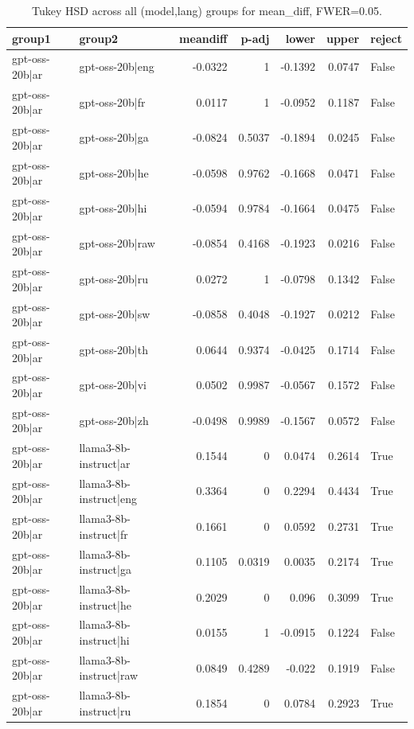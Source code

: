 \begin{table}
\caption{Tukey HSD across all (model,lang) groups for mean_diff, FWER=0.05.}
\label{tab:tukey_all_models_all_langs_mean_diff}
\begin{tabular}{l l r r r r l}
\toprule
group1 & group2 & meandiff & p-adj & lower & upper & reject \\
\midrule
gpt-oss-20b|ar & gpt-oss-20b|eng & -0.0322 & 1 & -0.1392 & 0.0747 & False \\
gpt-oss-20b|ar & gpt-oss-20b|fr & 0.0117 & 1 & -0.0952 & 0.1187 & False \\
gpt-oss-20b|ar & gpt-oss-20b|ga & -0.0824 & 0.5037 & -0.1894 & 0.0245 & False \\
gpt-oss-20b|ar & gpt-oss-20b|he & -0.0598 & 0.9762 & -0.1668 & 0.0471 & False \\
gpt-oss-20b|ar & gpt-oss-20b|hi & -0.0594 & 0.9784 & -0.1664 & 0.0475 & False \\
gpt-oss-20b|ar & gpt-oss-20b|raw & -0.0854 & 0.4168 & -0.1923 & 0.0216 & False \\
gpt-oss-20b|ar & gpt-oss-20b|ru & 0.0272 & 1 & -0.0798 & 0.1342 & False \\
gpt-oss-20b|ar & gpt-oss-20b|sw & -0.0858 & 0.4048 & -0.1927 & 0.0212 & False \\
gpt-oss-20b|ar & gpt-oss-20b|th & 0.0644 & 0.9374 & -0.0425 & 0.1714 & False \\
gpt-oss-20b|ar & gpt-oss-20b|vi & 0.0502 & 0.9987 & -0.0567 & 0.1572 & False \\
gpt-oss-20b|ar & gpt-oss-20b|zh & -0.0498 & 0.9989 & -0.1567 & 0.0572 & False \\
gpt-oss-20b|ar & llama3-8b-instruct|ar & 0.1544 & 0 & 0.0474 & 0.2614 & True \\
gpt-oss-20b|ar & llama3-8b-instruct|eng & 0.3364 & 0 & 0.2294 & 0.4434 & True \\
gpt-oss-20b|ar & llama3-8b-instruct|fr & 0.1661 & 0 & 0.0592 & 0.2731 & True \\
gpt-oss-20b|ar & llama3-8b-instruct|ga & 0.1105 & 0.0319 & 0.0035 & 0.2174 & True \\
gpt-oss-20b|ar & llama3-8b-instruct|he & 0.2029 & 0 & 0.096 & 0.3099 & True \\
gpt-oss-20b|ar & llama3-8b-instruct|hi & 0.0155 & 1 & -0.0915 & 0.1224 & False \\
gpt-oss-20b|ar & llama3-8b-instruct|raw & 0.0849 & 0.4289 & -0.022 & 0.1919 & False \\
gpt-oss-20b|ar & llama3-8b-instruct|ru & 0.1854 & 0 & 0.0784 & 0.2923 & True \\

\end{tabular}
\end{table}
